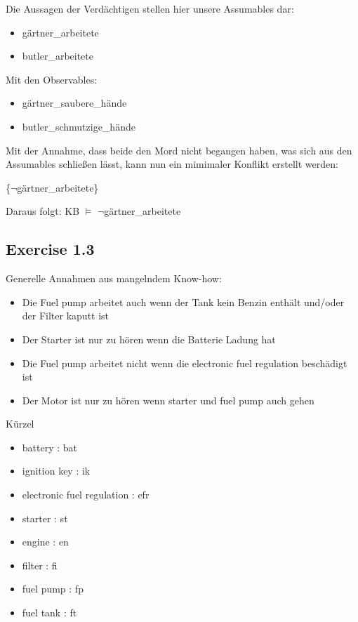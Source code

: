\documentclass[]{article}
\begin{document}
Die Aussagen der Verdächtigen stellen hier unsere Assumables dar:

\begin{itemize}
\itemsep1pt\parskip0pt
\item
  gärtner\_arbeitete
\item
  butler\_arbeitete
\end{itemize}

Mit den Observables:

\begin{itemize}
\itemsep1pt\parskip0pt
\item
  gärtner\_saubere\_hände
\item
  butler\_schmutzige\_hände
\end{itemize}

Mit der Annahme, dass beide den Mord nicht begangen haben, was sich aus
den Assumables schließen lässt, kann nun ein mimimaler Konflikt erstellt
werden:

\{$\neg$gärtner\_arbeitete\}

Daraus folgt: KB $\models$ $\neg$gärtner\_arbeitete

\subsection{Exercise 1.3}\label{exercise-1.3}

Generelle Annahmen aus mangelndem Know-how:

\begin{itemize}
  \item
    Die Fuel pump arbeitet auch wenn der Tank kein Benzin enthält und/oder
    der Filter kaputt ist
  \item
    Der Starter ist nur zu hören wenn die Batterie Ladung hat
  \item
    Die Fuel pump arbeitet nicht wenn die electronic fuel regulation
    beschädigt ist
  \item
    Der Motor ist nur zu hören wenn starter und fuel pump auch gehen
\end{itemize}
Kürzel
\begin{itemize}
\item
  battery : bat
\item
  ignition key : ik
\item
  electronic fuel regulation : efr
\item
  starter : st
\item
  engine : en
\item
  filter : fi
\item
  fuel pump : fp
\item
  fuel tank : ft
\end{itemize}
\end{document}
